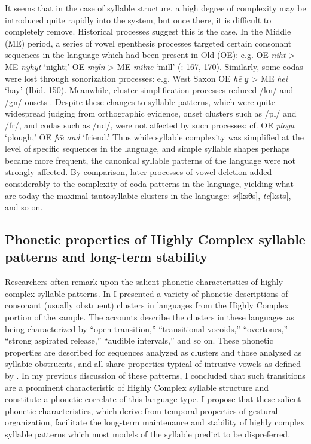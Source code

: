   It seems that in the case of syllable structure, a high degree of complexity may be introduced quite rapidly into the system, but once there, it is difficult to completely remove. Historical processes suggest this is the case. In the Middle  (ME) period, a series of vowel epenthesis processes targeted certain consonant sequences in the language which had been present in Old  (OE): e.g. OE \textit{niht} > ME \textit{nyhyt} ‘night;’ OE \textit{myln} > ME \textit{milne} ‘mill’ (\citealt{Jones1989}: 167, 170). Similarly, some codas were lost through sonorization processes: e.g. West Saxon OE \textit{he\={} ɡ} > ME \textit{hei} ‘hay’ (Ibid. 150). Meanwhile, cluster simplification processes reduced /kn/ and /gn/ onsets \citep{Minkova2003}. Despite these changes to syllable patterns, which were quite widespread judging from orthographic evidence, onset clusters such as /pl/ and /fr/, and codas such as /nd/, were not affected by such processes: cf. OE \textit{ploga} ‘plough,’ OE \textit{fre}\textsf{\={} }\textit{ond} ‘friend.’ Thus while syllable complexity was simplified at the level of specific sequences in the language, and simple syllable shapes perhaps became more frequent, the canonical syllable patterns of the language were not strongly affected. By comparison, later processes of vowel deletion added considerably to the complexity of coda patterns in the language, yielding what are today the maximal tautosyllabic clusters in the language: \textit{si}[ksθs], \textit{te}[ksts], and so on.

\subsection{Phonetic properties of Highly Complex syllable patterns and long-term stability}\label{sec:8.5.3}

  Researchers often remark upon the salient phonetic characteristics of highly complex syllable patterns. In  I presented a variety of phonetic descriptions of consonant (usually obstruent) clusters in languages from the Highly Complex portion of the sample. The accounts describe the clusters in these languages as being characterized by ``open transition,'' ``transitional vocoids,'' ``overtones,'' ``strong aspirated release,'' ``audible intervals,'' and so on. These phonetic properties are described for sequences analyzed as clusters and those analyzed as syllabic obstruents, and all share properties typical of intrusive vowels as defined by \citet{Hall2006}. In my previous discussion of these patterns, I concluded that such transitions are a prominent characteristic of Highly Complex syllable structure and constitute a phonetic correlate of this language type. I propose that these salient phonetic characteristics, which derive from temporal properties of gestural organization, facilitate the long-term maintenance and stability of highly complex syllable patterns which most models of the syllable predict to be dispreferred.

